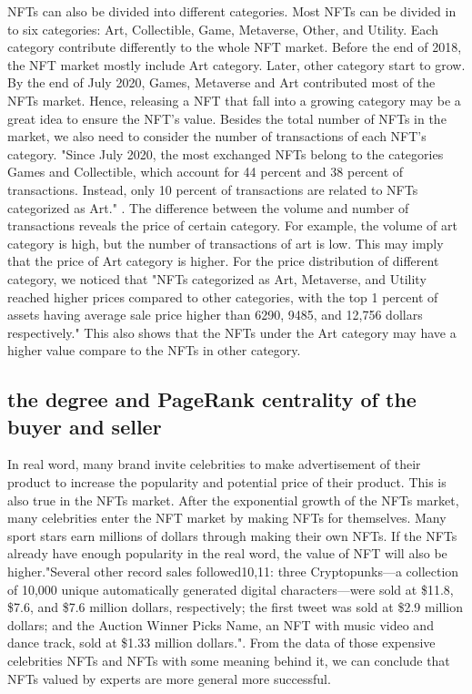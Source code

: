 NFTs can also be divided into different categories. Most NFTs can be divided in to six categories: Art, Collectible, Game, Metaverse, Other, and Utility.
Each category contribute differently to the whole NFT market. Before the end of 2018, the NFT market mostly include Art category. Later, other category start to grow. By the end of July 2020, Games, Metaverse and Art contributed most of the NFTs market. Hence, releasing a NFT that fall into a growing category may be a great idea to ensure the NFT's value. Besides the total number of NFTs in the market, we also need to consider the number of transactions of each NFT's category. "Since July 2020, the most exchanged NFTs belong to the categories Games and Collectible, which account for 44 percent and 38 percent of transactions. Instead, only 10 percent of transactions are related to NFTs categorized as Art." \cite{nadini2021mapping}. The difference between the volume and number of transactions reveals the price of certain category. For example, the volume of art category is high, but the number of transactions of art is low. This may imply that the price of Art category is higher. For the price distribution of different category, we noticed that "NFTs categorized as Art, Metaverse, and Utility reached higher prices compared to other categories, with the top 1 percent of assets having average sale price higher than 6290, 9485, and 12,756 dollars respectively.\cite{nadini2021mapping}" This also shows that the NFTs under the Art category may have a higher value compare to the NFTs in other category.

\subsection{the degree and PageRank centrality of the buyer and seller}

In real word, many brand invite celebrities to make advertisement of their product to increase the popularity and potential price of their product. This is also true in the NFTs market. After the exponential growth of the NFTs market, many celebrities enter the NFT market by making NFTs for themselves. Many sport stars earn millions of dollars through making their own NFTs. If the NFTs already have enough popularity in the real word, the value of NFT will also be higher."Several other record sales followed10,11: three Cryptopunks—a collection of 10,000 unique automatically generated digital characters—were sold at \$11.8, \$7.6, and \$7.6 million dollars, respectively; the first tweet was sold at \$2.9 million dollars; and the Auction Winner Picks Name, an NFT with music video and dance track, sold at \$1.33 million dollars."\cite{nadini2021mapping}. From the data of those expensive celebrities NFTs and NFTs with some meaning behind it, we can conclude that NFTs valued by experts are more general more successful.  

